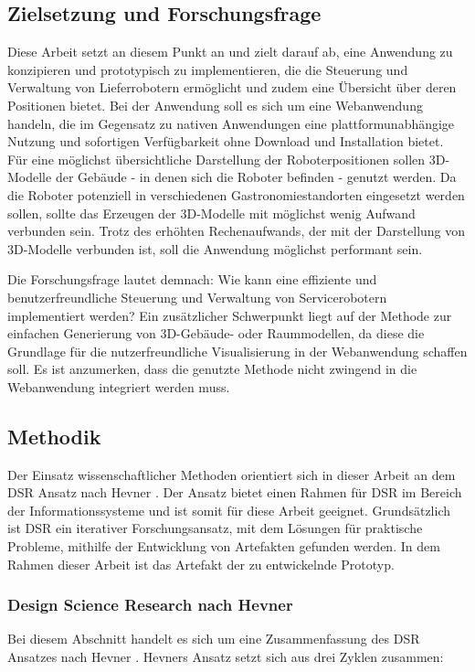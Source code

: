 \subsection{Zielsetzung und Forschungsfrage}
Diese Arbeit setzt an diesem Punkt an und zielt darauf ab, eine Anwendung zu konzipieren und prototypisch zu implementieren, die die Steuerung und Verwaltung von Lieferrobotern ermöglicht und zudem eine Übersicht über deren Positionen bietet. Bei der Anwendung soll es sich um eine Webanwendung handeln, die im Gegensatz zu nativen Anwendungen eine plattformunabhängige Nutzung und sofortigen Verfügbarkeit ohne Download und Installation bietet. Für eine möglichst übersichtliche Darstellung der Roboterpositionen sollen 3D-Modelle der Gebäude - in denen sich die Roboter befinden - genutzt werden. Da die Roboter potenziell in verschiedenen Gastronomiestandorten eingesetzt werden sollen, sollte das Erzeugen der 3D-Modelle mit möglichst wenig Aufwand verbunden sein. Trotz des erhöhten Rechenaufwands, der mit der Darstellung von 3D-Modelle verbunden ist, soll die Anwendung möglichst performant sein.

Die Forschungsfrage lautet demnach: Wie kann eine effiziente und benutzerfreundliche Steuerung und Verwaltung von Servicerobotern implementiert werden? Ein zusätzlicher Schwerpunkt liegt auf der Methode zur einfachen Generierung von 3D-Gebäude- oder Raummodellen, da diese die Grundlage für die nutzerfreundliche Visualisierung in der Webanwendung schaffen soll. Es ist anzumerken, dass die genutzte Methode nicht zwingend in die Webanwendung integriert werden muss.

\subsection{Methodik}
Der Einsatz wissenschaftlicher Methoden orientiert sich in dieser Arbeit an dem \ac{DSR} Ansatz nach Hevner \cite{Hevner2004}. Der Ansatz bietet einen Rahmen für \ac{DSR} im Bereich der Informationssysteme und ist somit für diese Arbeit geeignet. Grundsätzlich ist \ac{DSR} ein iterativer Forschungsansatz, mit dem Lösungen für praktische Probleme, mithilfe der Entwicklung von Artefakten gefunden werden. In dem Rahmen dieser Arbeit ist das Artefakt der zu entwickelnde Prototyp.

\subsubsection{Design Science Research nach Hevner}
Bei diesem Abschnitt handelt es sich um eine Zusammenfassung des \ac{DSR} Ansatzes nach Hevner \cite[S.~79-81]{Hevner2004}. Hevners Ansatz setzt sich aus drei Zyklen zusammen:

